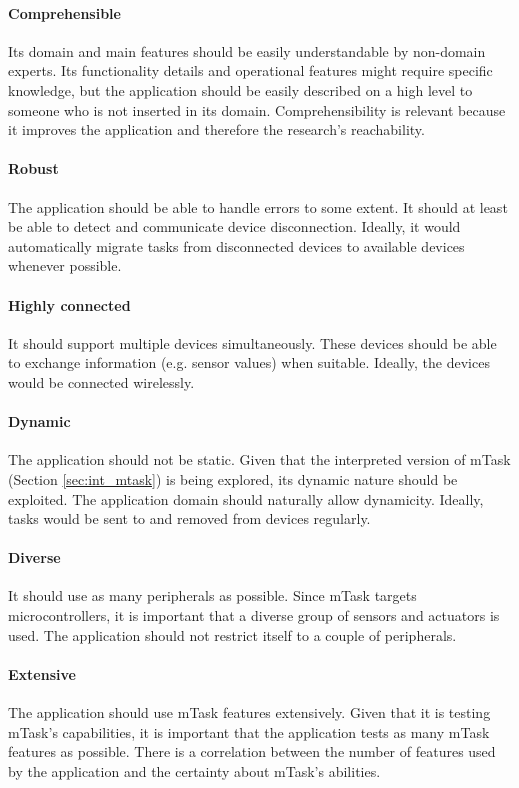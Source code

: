 \paragraph{Comprehensible} Its domain and main features should be easily understandable by non-domain experts. Its functionality details and operational features might require specific knowledge, but the application should be easily described on a high level to someone who is not inserted in its domain. Comprehensibility is relevant because it improves the application and therefore the research's reachability. 

\paragraph{Robust} The application should be able to handle errors to some extent. It should at least be able to detect and communicate device disconnection. Ideally, it would automatically migrate tasks from disconnected devices to available devices whenever possible. 

\paragraph{Highly connected} It should support multiple devices simultaneously. These devices should be able to exchange information (e.g. sensor values) when suitable. Ideally, the devices would be connected wirelessly.

\paragraph{Dynamic} The application should not be static. Given that the interpreted version of \gls{mTask} (Section \ref{sec:int_mtask}) is being explored, its dynamic nature should be exploited. The application domain should naturally allow dynamicity. Ideally, tasks would be sent to and removed from devices regularly.

\paragraph{Diverse} It should use as many peripherals as possible. Since \gls{mTask} targets microcontrollers, it is important that a diverse group of sensors and actuators is used. The application should not restrict itself to a couple of peripherals. 

\paragraph{Extensive} The application should use \gls{mTask} features extensively. Given that it is testing \gls{mTask}'s capabilities, it is important that the application tests as many \gls{mTask} features as possible. There is a correlation between the number of features used by the application and the certainty about \gls{mTask}'s abilities.

